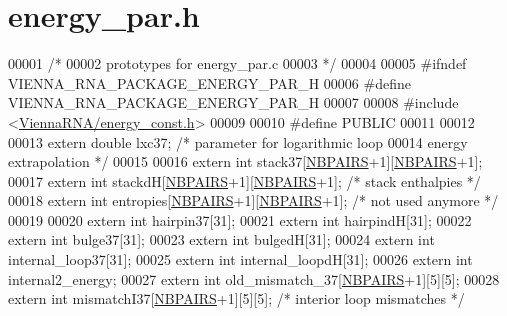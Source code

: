 \hypertarget{energy__par_8h_source}{\section{energy\+\_\+par.\+h}
\label{energy__par_8h_source}
}

\begin{DoxyCode}
00001 \textcolor{comment}{/*}
00002 \textcolor{comment}{   prototypes for energy\_par.c}
00003 \textcolor{comment}{*/}
00004 
00005 \textcolor{preprocessor}{#ifndef VIENNA\_RNA\_PACKAGE\_ENERGY\_PAR\_H}
00006 \textcolor{preprocessor}{#define VIENNA\_RNA\_PACKAGE\_ENERGY\_PAR\_H}
00007 
00008 \textcolor{preprocessor}{#include <\hyperlink{energy__const_8h}{ViennaRNA/energy\_const.h}>}
00009 
00010 \textcolor{preprocessor}{#define PUBLIC}
00011 
00012 
00013 \textcolor{keyword}{extern} \textcolor{keywordtype}{double} lxc37;   \textcolor{comment}{/* parameter for logarithmic loop}
00014 \textcolor{comment}{        energy extrapolation            */}
00015 
00016 \textcolor{keyword}{extern} \textcolor{keywordtype}{int} stack37[\hyperlink{energy__const_8h_a5e75221c779d618eab81e096f37e32ce}{NBPAIRS}+1][\hyperlink{energy__const_8h_a5e75221c779d618eab81e096f37e32ce}{NBPAIRS}+1];
00017 \textcolor{keyword}{extern} \textcolor{keywordtype}{int} stackdH[\hyperlink{energy__const_8h_a5e75221c779d618eab81e096f37e32ce}{NBPAIRS}+1][\hyperlink{energy__const_8h_a5e75221c779d618eab81e096f37e32ce}{NBPAIRS}+1]; \textcolor{comment}{/* stack enthalpies */}
00018 \textcolor{keyword}{extern} \textcolor{keywordtype}{int} entropies[\hyperlink{energy__const_8h_a5e75221c779d618eab81e096f37e32ce}{NBPAIRS}+1][\hyperlink{energy__const_8h_a5e75221c779d618eab81e096f37e32ce}{NBPAIRS}+1];  \textcolor{comment}{/* not used anymore */}
00019 
00020 \textcolor{keyword}{extern} \textcolor{keywordtype}{int} hairpin37[31];
00021 \textcolor{keyword}{extern} \textcolor{keywordtype}{int} hairpindH[31];
00022 \textcolor{keyword}{extern} \textcolor{keywordtype}{int} bulge37[31];
00023 \textcolor{keyword}{extern} \textcolor{keywordtype}{int} bulgedH[31];
00024 \textcolor{keyword}{extern} \textcolor{keywordtype}{int} internal\_loop37[31];
00025 \textcolor{keyword}{extern} \textcolor{keywordtype}{int} internal\_loopdH[31];
00026 \textcolor{keyword}{extern} \textcolor{keywordtype}{int} internal2\_energy;
00027 \textcolor{keyword}{extern} \textcolor{keywordtype}{int} old\_mismatch\_37[\hyperlink{energy__const_8h_a5e75221c779d618eab81e096f37e32ce}{NBPAIRS}+1][5][5];
00028 \textcolor{keyword}{extern} \textcolor{keywordtype}{int} mismatchI37[\hyperlink{energy__const_8h_a5e75221c779d618eab81e096f37e32ce}{NBPAIRS}+1][5][5];  \textcolor{comment}{/* interior loop mismatches */}

\end{DoxyCode}
